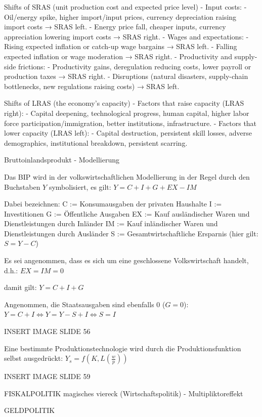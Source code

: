 Shifts of SRAS (unit production cost and expected price level)
- Input costs:
  - Oil/energy spike, higher import/input prices, currency depreciation raising import costs → SRAS left.
  - Energy price fall, cheaper inputs, currency appreciation lowering import costs → SRAS right.
- Wages and expectations:
  - Rising expected inflation or catch-up wage bargains → SRAS left.
  - Falling expected inflation or wage moderation → SRAS right.
- Productivity and supply-side frictions:
  - Productivity gains, deregulation reducing costs, lower payroll or production taxes → SRAS right.
  - Disruptions (natural disasters, supply-chain bottlenecks, new regulations raising costs) → SRAS left.

Shifts of LRAS (the economy’s capacity)
- Factors that raise capacity (LRAS right):
  - Capital deepening, technological progress, human capital, higher labor force participation/immigration, better institutions, infrastructure.
- Factors that lower capacity (LRAS left):
  - Capital destruction, persistent skill losses, adverse demographics, institutional breakdown, persistent scarring.



Bruttoinlandsprodukt - Modellierung

Das BIP wird in der volkswirtschaftlichen Modellierung in der Regel durch den Buchstaben \( Y \) symbolisiert, es gilt:
\(
Y = C + I + G + EX - IM
\)

Dabei bezeichnen:
C := Konsumausgaben der privaten Haushalte
I := Investitionen
G := Öffentliche Ausgaben
EX := Kauf ausländischer Waren und Dienstleistungen durch Inländer
IM := Kauf inländischer Waren und Dienstleistungen durch Ausländer
S := Gesamtwirtschaftliche Ersparnis (hier gilt: \( S = Y - C \))

Es sei angenommen, dass es sich um eine geschlossene Volkswirtschaft handelt, d.h.: \(EX = IM = 0\)

damit gilt: \(Y = C + I + G\)

Angenommen, die Staatsausgaben sind ebenfalls 0 (\( G = 0 \)): \(Y = C + I \iff Y = Y - S + I \iff S = I\)


INSERT IMAGE SLIDE 56

Eine bestimmte Produktionstechnologie wird durch die
Produktionsfunktion selbst ausgedrückt:
\( Y_s = f(K, L(\frac{w}{p})) \)

INSERT IMAGE SLIDE 59

FISKALPOLITIK
magisches viereck (Wirtschaftspolitik)
- Multipliktoreffekt

GELDPOLITIK

